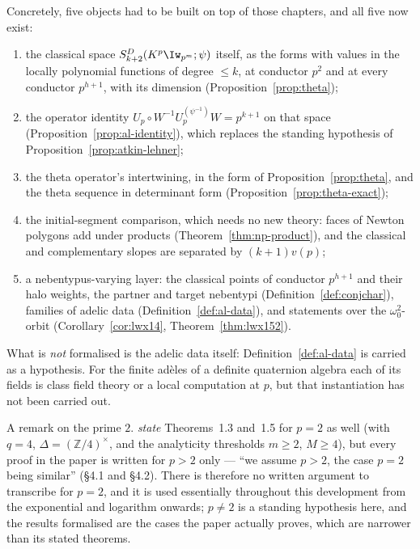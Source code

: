 Concretely, five objects had to be built on top of those chapters, and all five now exist:

\begin{enumerate}
  \item the classical space $S^{D}_{k+2}(K^{p}\Iw_{p^{m}};\psi)$ itself, as the forms with values
    in the locally polynomial functions of degree $\leq k$, at conductor $p^{2}$ and at every
    conductor $p^{h+1}$, with its dimension (Proposition~\ref{prop:theta});
  \item the operator identity $U_p \circ W^{-1} U_p^{(\psi^{-1})} W = p^{k+1}$ on that space
    (Proposition~\ref{prop:al-identity}), which replaces the standing hypothesis of
    Proposition~\ref{prop:atkin-lehner};
  \item the theta operator's intertwining, in the form of Proposition~\ref{prop:theta}, and the
    theta sequence in determinant form (Proposition~\ref{prop:theta-exact});
  \item the initial-segment comparison, which needs no new theory: faces of Newton polygons add
    under products (Theorem~\ref{thm:np-product}), and the classical and complementary slopes are
    separated by $(k+1)v(p)$;
  \item a nebentypus-varying layer: the classical points of conductor $p^{h+1}$ and their halo
    weights, the partner and target nebentypi (Definition~\ref{def:conjchar}), families of adelic
    data (Definition~\ref{def:al-data}), and statements over the $\omega_0^{2}$-orbit
    (Corollary~\ref{cor:lwx14}, Theorem~\ref{thm:lwx152}).
\end{enumerate}

What is \emph{not} formalised is the adelic data itself: Definition~\ref{def:al-data} is carried as
a hypothesis.  For the finite ad\`eles of a definite quaternion algebra each of its fields is class
field theory or a local computation at $p$, but that instantiation has not been carried out.

A remark on the prime $2$.  \cite{LWX} \emph{state} Theorems~1.3 and~1.5 for $p = 2$ as well
(with $q = 4$, $\Delta = (\mathbb{Z}/4)^\times$, and the analyticity thresholds $m \ge 2$,
$M \ge 4$), but every proof in the paper is written for $p > 2$ only --- ``we assume $p > 2$, the
case $p = 2$ being similar'' (\S4.1 and \S4.2).  There is therefore no written argument to
transcribe for $p = 2$, and it is used essentially throughout this development from the
exponential and logarithm onwards; $p \ne 2$ is a standing hypothesis here, and the results
formalised are the cases the paper actually proves, which are narrower than its stated theorems.

